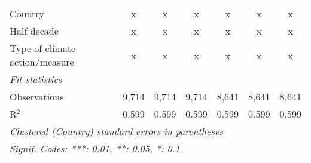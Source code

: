 \begin{tabular}{lcccccc}
   Country                                                          & x       & x            & x            & x            & x            & x\\  
   Half decade                                                      & x       & x            & x            & x            & x            & x\\  
   Type of climate action/measure                                   & x       & x            & x            & x            & x            & x\\  
   \midrule \emph{Fit statistics}\\
   Observations                                                     & 9,714   & 9,714        & 9,714        & 8,641        & 8,641        & 8,641\\  
   R$^2$                                                            & 0.599   & 0.599        & 0.599        & 0.599        & 0.599        & 0.599\\  
   \midrule
   \multicolumn{7}{l}{\emph{Clustered (Country) standard-errors in parentheses}}\\
   \multicolumn{7}{l}{\emph{Signif. Codes: ***: 0.01, **: 0.05, *: 0.1}}\\
\end{tabular}
\par\endgroup


